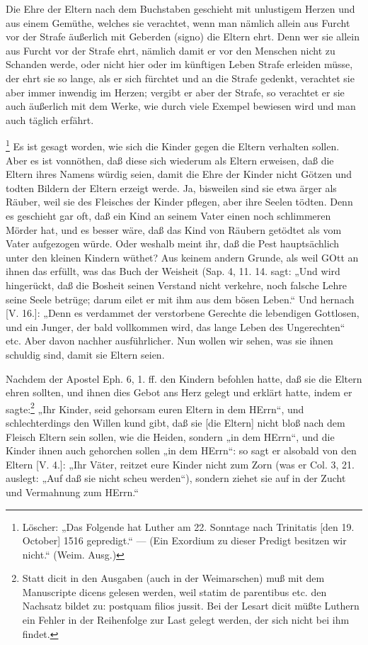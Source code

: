 Die Ehre der Eltern nach dem Buchstaben geschieht mit unlustigem Herzen und aus einem Gemüthe, welches sie verachtet, wenn man nämlich allein aus Furcht vor der Strafe äußerlich mit Geberden (signo) die Eltern ehrt. Denn wer sie allein aus Furcht vor der Strafe ehrt, nämlich damit er vor den Menschen nicht zu Schanden werde, oder nicht hier oder im künftigen Leben Strafe erleiden müsse, der ehrt sie so lange, als er sich fürchtet und an die Strafe gedenkt, verachtet sie aber immer inwendig im Herzen; vergibt er aber der Strafe, so verachtet er sie auch äußerlich mit dem Werke, wie durch viele Exempel bewiesen wird und man auch täglich erfährt.

\footnote{Löscher: „Das Folgende hat Luther am 22. Sonntage nach Trinitatis [den 19. October] 1516 gepredigt.“ — (Ein Exordium zu dieser Predigt besitzen wir nicht.“ (Weim. Ausg.)} Es ist gesagt worden, wie sich die Kinder gegen die Eltern verhalten sollen. Aber es ist vonnöthen, daß diese sich wiederum als Eltern erweisen, daß die Eltern ihres Namens würdig seien, damit die Ehre der Kinder nicht Götzen und todten Bildern der Eltern erzeigt werde. Ja, bisweilen sind sie etwa ärger als Räuber, weil sie des Fleisches der Kinder pflegen, aber ihre Seelen tödten. Denn es geschieht gar oft, daß ein Kind an seinem Vater einen noch schlimmeren Mörder hat, und es besser wäre, daß das Kind von Räubern getödtet als vom Vater aufgezogen würde. Oder weshalb meint ihr, daß die Pest hauptsächlich unter den kleinen Kindern wüthet? Aus keinem andern Grunde, als weil GOtt an ihnen das erfüllt, was das Buch der Weisheit (Sap. 4, 11. 14. sagt: „Und wird hingerückt, daß die Bosheit seinen Verstand nicht verkehre, noch falsche Lehre seine Seele betrüge; darum eilet er mit ihm aus dem bösen Leben.“ Und hernach [V. 16.]: „Denn es verdammet der verstorbene Gerechte die lebendigen Gottlosen, und ein Junger, der bald vollkommen wird, das lange Leben des Ungerechten“ etc. Aber davon nachher ausführlicher. Nun wollen wir sehen, was sie ihnen schuldig sind, damit sie Eltern seien.

Nachdem der Apostel Eph. 6, 1. ff. den Kindern befohlen hatte, daß sie die Eltern ehren sollten, und ihnen dies Gebot ans Herz gelegt und erklärt hatte, indem er sagte:\footnote{Statt dicit in den Ausgaben (auch in der Weimarschen) muß mit dem Manuscripte dicens gelesen werden, weil statim de parentibus etc. den Nachsatz bildet zu: postquam filios jussit. Bei der Lesart dicit müßte Luthern ein Fehler in der Reihenfolge zur Last gelegt werden, der sich nicht bei ihm findet.} „Ihr Kinder, seid gehorsam euren Eltern in dem HErrn“, und schlechterdings den Willen kund gibt, daß
sie [die Eltern] nicht bloß nach dem Fleisch Eltern sein sollen, wie die Heiden, sondern „in dem HErrn“, und die Kinder ihnen auch gehorchen sollen „in dem HErrn“: so sagt er alsobald von den Eltern [V. 4.]: „Ihr Väter, reitzet eure Kinder nicht zum Zorn (was er Col. 3, 21. auslegt: „Auf daß sie nicht scheu werden“), sondern ziehet sie auf in der Zucht und Vermahnung zum HErrn.“

